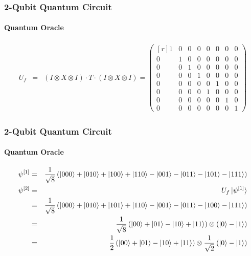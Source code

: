 \begin{frame}
	\frametitle{2-Qubit Quantum Circuit}
	\framesubtitle{Quantum Oracle}
	
	\begin{eqnarray*}
		U_f & = & \left(I\otimes X \otimes I\right) \cdot T \cdot \left(I\otimes X \otimes I\right) = 
			\begin{pmatrix*}[r]
					1 & 0 & 0 & 0 & 0 & 0 & 0 & 0 \\
					0 & 1 & 0 & 0 & 0 & 0 & 0 & 0 \\
					0 & 0 & 1 & 0 & 0 & 0 & 0 & 0 \\
					0 & 0 & 0 & 1 & 0 & 0 & 0 & 0 \\
					0 & 0 & 0 & 0 & 0 & 1 & 0 & 0 \\
					0 & 0 & 0 & 0 & 1 & 0 & 0 & 0 \\
					0 & 0 & 0 & 0 & 0 & 0 & 1 & 0 \\
					0 & 0 & 0 & 0 & 0 & 0 & 0 & 1
		    \end{pmatrix*}
	\end{eqnarray*}
\end{frame}

\begin{frame}
	\frametitle{2-Qubit Quantum Circuit}
	\framesubtitle{Quantum Oracle}
	
	\begin{eqnarray*}
		\psi^{[1]} & = &\frac{1}{\sqrt{8}}\left(\ket{000} + \ket{010} + \ket{100} + \ket{110} - \ket{001} - \ket{011} - \ket{101} - \ket{111} \right) \\  
		\psi^{[2]} & = & U_f\ket{\psi^{[1]}}\\
				   & = & \frac{1}{\sqrt{8}}\left(\ket{000} + \ket{010} + \ket{101} + \ket{110} - \ket{001} - \ket{011} - \ket{100} - \ket{111} \right) \\  
				   & = & \frac{1}{\sqrt{8}}\left(\ket{00} + \ket{01} - \ket{10} + \ket{11}\right)\otimes\left(\ket{0} - \ket{1}\right) \\
				   & = & \frac{1}{2}\left(\ket{00} + \ket{01} - \ket{10} + \ket{11}\right)\otimes\frac{1}{\sqrt{2}}\left(\ket{0} - \ket{1}\right)
	\end{eqnarray*}
\end{frame}

